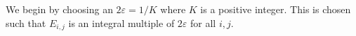 We begin by choosing an $2\varepsilon=1/K$ where $K$ is a positive integer.
This is chosen such that $E_{i,j}$ is an integral multiple of $2\varepsilon$ for all $i,j$.




%
%
